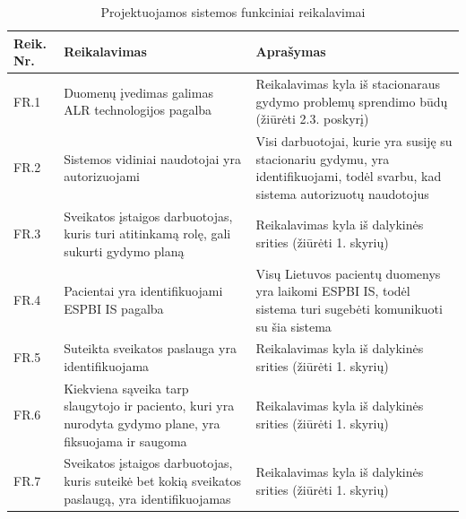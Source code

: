 \begin{table}[!ht]
    \centering
    \renewcommand{\arraystretch}{1.2}
    \renewcommand\thetable{5}

    \begin{tabular}{|m{3em}|m{17em}|m{17em}|}
    \hline 
    \rowcolor[HTML]{EFEFEF} 
    Reik. Nr. & Reikalavimas & Aprašymas \\ \hline
    FR.1  &  Duomenų įvedimas galimas ALR technologijos pagalba  & Reikalavimas kyla iš stacionaraus gydymo problemų sprendimo būdų  (žiūrėti 2.3. poskyrį)    \\ \hline
    FR.2  &  Sistemos vidiniai naudotojai yra autorizuojami  &  Visi darbuotojai, kurie yra susiję su stacionariu gydymu,  yra identifikuojami, todėl svarbu, kad sistema autorizuotų naudotojus       \\ \hline
    FR.3  &  Sveikatos įstaigos darbuotojas, kuris turi atitinkamą rolę, gali sukurti gydymo planą  &   Reikalavimas kyla iš dalykinės srities (žiūrėti 1. skyrių)       \\ \hline
    FR.4  &  Pacientai yra identifikuojami ESPBI IS pagalba  &  Visų Lietuvos pacientų duomenys yra laikomi ESPBI IS, todėl sistema turi sugebėti komunikuoti su šia sistema      \\ \hline
    FR.5  &  Suteikta sveikatos paslauga yra identifikuojama  &   Reikalavimas kyla iš dalykinės srities (žiūrėti 1. skyrių)      \\ \hline
    FR.6  &  Kiekviena sąveika tarp slaugytojo ir paciento, kuri yra nurodyta gydymo plane, yra fiksuojama ir saugoma  &   Reikalavimas kyla iš dalykinės srities (žiūrėti 1. skyrių)       \\ \hline
    FR.7  &  Sveikatos įstaigos darbuotojas, kuris suteikė bet kokią sveikatos paslaugą, yra identifikuojamas  &   Reikalavimas kyla iš dalykinės srities (žiūrėti 1. skyrių)        \\ \hline
    
    \end{tabular}
    \caption{Projektuojamos sistemos funkciniai reikalavimai} 
\end{table}

